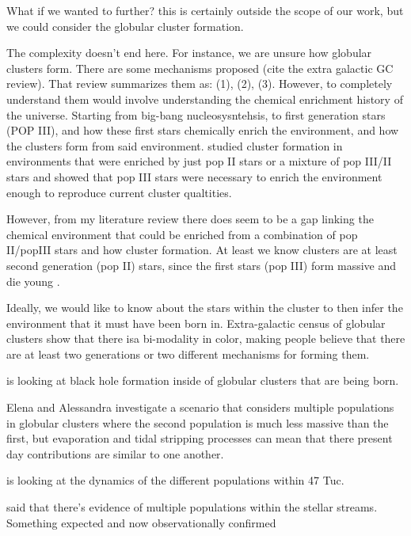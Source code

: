     What if we wanted to further? this is certainly outside the scope of our work, but we could consider the globular cluster formation. 

    The complexity doesn't end here. For instance, we are unsure how globular clusters form. There are some mechanisms proposed (cite the extra galactic GC review). That review summarizes them as: (1), (2), (3). However, to completely understand them would involve understanding the chemical enrichment history of the universe. Starting from big-bang nucleosysntehsis, to first generation stars (POP III), and how these first stars chemically enrich the environment, and how the clusters form from said environment. \citet{2022A&A...668A.191C} studied cluster formation in environments that were enriched by just pop II stars or a mixture of pop III/II stars and showed that pop III stars were necessary to enrich the environment enough to reproduce current cluster qualtities. 

    However, from my literature review there does seem to be a gap linking the chemical environment that could be enriched from a combination of pop II/popIII stars and how cluster formation. At least we know clusters are at least second generation (pop II) stars, since the first stars (pop III) form massive and die young \citep{2002ApJ...571...30S}.

    Ideally, we would like to know about the stars within the cluster to then infer the environment that it must have been born in. Extra-galactic census of globular clusters show that there isa bi-modality in color, making people believe that there are at least two generations or two different mechanisms for forming them. 

    \citet{2025arXiv250507491V} is looking at black hole formation inside of globular clusters that are being born. 

    \citet{2024A&A...681A..45L} Elena and Alessandra investigate a scenario that considers multiple populations in globular clusters where the second population is much less massive than the first, but evaporation and tidal stripping processes can mean that there present day contributions are similar to one another. 

    \citet{2025MNRAS.537.2342C} is looking at the dynamics of the different populations within 47 Tuc.

    \citet{2024MNRAS.529.2413U} said that there's evidence of multiple populations within the stellar streams. Something expected and now observationally confirmed 

